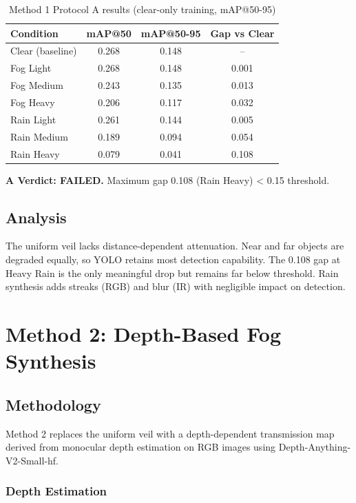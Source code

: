 \documentclass[11pt,a4paper]{article}
\begin{document}
\begin{table}[H]
\centering
\caption{Method 1 Protocol A results (clear-only training, mAP@50-95)}
\label{tab:method1_results}
\begin{tabular}{lccc}
\toprule
Condition & mAP@50 & mAP@50-95 & Gap vs Clear \\
\midrule
Clear (baseline) & 0.268 & 0.148 & -- \\
Fog Light & 0.268 & 0.148 & 0.001 \\
Fog Medium & 0.243 & 0.135 & 0.013 \\
Fog Heavy & 0.206 & 0.117 & 0.032 \\
Rain Light & 0.261 & 0.144 & 0.005 \\
Rain Medium & 0.189 & 0.094 & 0.054 \\
Rain Heavy & 0.079 & 0.041 & 0.108 \\
\bottomrule
\end{tabular}
\end{table}

\textbf{A Verdict: FAILED.} Maximum gap 0.108 (Rain Heavy) < 0.15 threshold.

\subsection{Analysis}

The uniform veil lacks distance-dependent attenuation. Near and far objects are degraded equally, so YOLO retains most detection capability. The 0.108 gap at Heavy Rain is the only meaningful drop but remains far below threshold. Rain synthesis adds streaks (RGB) and blur (IR) with negligible impact on detection.

\section{Method 2: Depth-Based Fog Synthesis}

\subsection{Methodology}

Method 2 replaces the uniform veil with a depth-dependent transmission map derived from monocular depth estimation on RGB images using Depth-Anything-V2-Small-hf.

\subsubsection{Depth Estimation}
\end{document}
